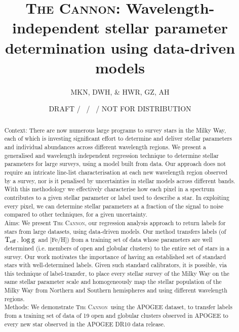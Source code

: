 \documentclass[12pt, preprint]{aastex}
\newcommand{\teff}{\mbox{$\rm T_{eff}$}}
\newcommand{\logg}{\mbox{$\rm \log g$}}
\newcommand{\tc}{\textsc{The Cannon}}
\begin{document}
\title{\textsc{The Cannon:} Wavelength-independent stellar parameter determination using data-driven models}
\author{
  MKN,
  DWH,
  \&
  HWR,
  GZ, AH} 
\date{DRAFT / \gitdate\ / \githash\ / NOT FOR DISTRIBUTION}



\begin{abstract}

Context: There are now numerous large programs to survey stars in the Milky Way, each of which is investing significant effort to determine and deliver stellar parameters and individual abundances across different wavelength regions. We present a generalised and wavelength independent regression technique to determine stellar parameters for large surveys, using a model built from data. Our approach does not require an intricate line-list characterisation at each new wavelength region observed by a survey, nor is it penalised by uncertainties in stellar models across different bands. With this methodology we effectively characterise how each pixel in a spectrum contributes to a given stellar parameter or label used to describe a star. In exploiting every pixel, we can determine stellar parameters at a fraction of the signal to noise compared to other techniques, for a given uncertainty. \\
Aims: We present \tc, our regression analysis approach to return labels for stars from large datasets, using data-driven models.  Our method transfers labels (of \teff, \logg\ and [Fe/H]) from a training set of data whose parameters are well determined (i.e. members of open and globular clusters) to the entire set of stars in a survey. Our work motivates the importance of having an established set of standard stars with well-determined labels. Given such standard calibrators, it is possible, via this technique of label-transfer, to place every stellar survey of the Milky Way on the same stellar parameter scale and homogeneously map the stellar population of the Milky Way from Northern and Southern hemispheres and using different wavelength regions. \\
Methods: We demonstrate \tc\ using the APOGEE dataset, to transfer labels from a training set of data of 19 open and globular clusters observed in APOGEE to every new star observed in the APOGEE DR10 data release. \\

\end{abstract}
\end{document}

